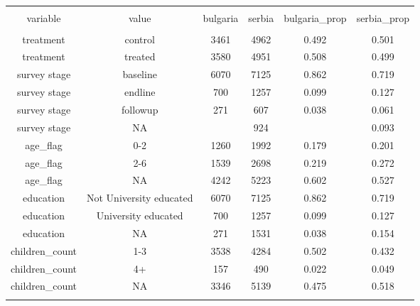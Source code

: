 
\begin{table}[!htbp] \centering 
  \caption{} 
  \label{tbl:descriptives_controls_respondent_count} 
\begin{tabular}{@{\extracolsep{5pt}} cccccc} 
\\[-1.8ex]\hline 
\hline \\[-1.8ex] 
variable & value & bulgaria & serbia & bulgaria\_prop & serbia\_prop \\ 
\hline \\[-1.8ex] 
treatment & control & 3461 & 4962 & 0.492 & 0.501 \\ 
treatment & treated & 3580 & 4951 & 0.508 & 0.499 \\ 
survey stage & baseline & 6070 & 7125 & 0.862 & 0.719 \\ 
survey stage & endline &  700 & 1257 & 0.099 & 0.127 \\ 
survey stage & followup &  271 &  607 & 0.038 & 0.061 \\ 
survey stage & NA &  &  924 &  & 0.093 \\ 
age\_flag & 0-2 & 1260 & 1992 & 0.179 & 0.201 \\ 
age\_flag & 2-6 & 1539 & 2698 & 0.219 & 0.272 \\ 
age\_flag & NA & 4242 & 5223 & 0.602 & 0.527 \\ 
education & Not University educated & 6070 & 7125 & 0.862 & 0.719 \\ 
education & University educated &  700 & 1257 & 0.099 & 0.127 \\ 
education & NA &  271 & 1531 & 0.038 & 0.154 \\ 
children\_count & 1-3 & 3538 & 4284 & 0.502 & 0.432 \\ 
children\_count & 4+ &  157 &  490 & 0.022 & 0.049 \\ 
children\_count & NA & 3346 & 5139 & 0.475 & 0.518 \\ 
\hline \\[-1.8ex] 
\end{tabular} 
\end{table} 
